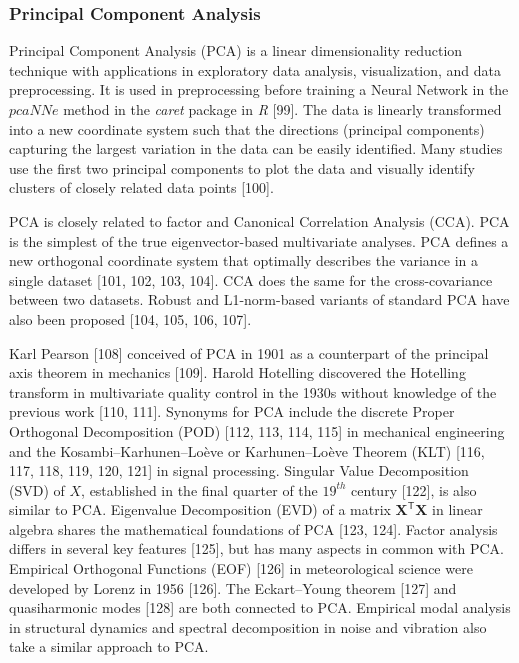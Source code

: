 \documentclass[sn-mathphys-num]{sn-jnl}%
\begin{document}
\subsubsection{Principal Component Analysis}

Principal Component Analysis (PCA) is a linear dimensionality reduction technique with applications in exploratory data analysis, visualization, and data preprocessing. It is used in preprocessing before training a Neural Network in the $pcaNNe$ method in the \textit{caret} package in \textit{R} [99]. The data is linearly transformed into a new coordinate system such that the directions (principal components) capturing the largest variation in the data can be easily identified. Many studies use the first two principal components to plot the data and visually identify clusters of closely related data points [100].

PCA is closely related to factor and Canonical Correlation Analysis (CCA). PCA is the simplest of the true eigenvector-based multivariate analyses. PCA defines a new orthogonal coordinate system that optimally describes the variance in a single dataset [101, 102, 103, 104]. CCA does the same for the cross-covariance between two datasets. Robust and L1-norm-based variants of standard PCA have also been proposed [104, 105, 106, 107].

Karl Pearson [108] conceived of PCA in 1901 as a counterpart of the principal axis theorem in mechanics [109]. Harold Hotelling discovered the Hotelling transform in multivariate quality control in the 1930s without knowledge of the previous work [110, 111]. Synonyms for PCA include the discrete Proper Orthogonal Decomposition (POD) [112, 113, 114, 115] in mechanical engineering and the Kosambi–Karhunen–Loève or Karhunen–Loève Theorem (KLT) [116, 117, 118, 119, 120, 121] in signal processing. Singular Value Decomposition (SVD) of $X$, established in the final quarter of the $19^{th}$ century [122], is also similar to PCA. Eigenvalue Decomposition (EVD) of a matrix $\mathbf{X}^{\mathsf{T}}\mathbf{X}$ in linear algebra shares the mathematical foundations of PCA [123, 124]. Factor analysis differs in several key features [125], but has many aspects in common with PCA. Empirical Orthogonal Functions (EOF) [126] in meteorological science were developed by Lorenz in 1956 [126]. The Eckart–Young theorem [127] and quasiharmonic modes [128] are both connected to PCA. Empirical modal analysis in structural dynamics and spectral decomposition in noise and vibration also take a similar approach to PCA.
\end{document}
